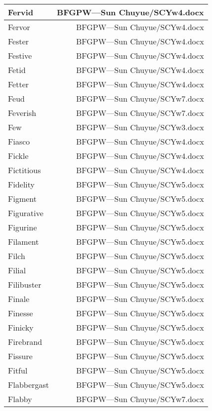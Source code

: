 \documentclass{article}
\begin{document}
\begin{center}
\begin{longtable}{|l|r|}
\hline
Fervid  &  BFGPW---Sun Chuyue/SCYw4.docx\\  
\hline
Fervor  &  BFGPW---Sun Chuyue/SCYw4.docx\\  
\hline
Fester  &  BFGPW---Sun Chuyue/SCYw4.docx\\  
\hline
Festive  &  BFGPW---Sun Chuyue/SCYw4.docx\\  
\hline
Fetid  &  BFGPW---Sun Chuyue/SCYw4.docx\\  
\hline
Fetter  &  BFGPW---Sun Chuyue/SCYw4.docx\\  
\hline
Feud  &  BFGPW---Sun Chuyue/SCYw7.docx\\  
\hline
Feverish  &  BFGPW---Sun Chuyue/SCYw7.docx\\  
\hline
Few  &  BFGPW---Sun Chuyue/SCYw3.docx\\  
\hline
Fiasco  &  BFGPW---Sun Chuyue/SCYw4.docx\\  
\hline
Fickle  &  BFGPW---Sun Chuyue/SCYw4.docx\\  
\hline
Fictitious  &  BFGPW---Sun Chuyue/SCYw4.docx\\  
\hline
Fidelity  &  BFGPW---Sun Chuyue/SCYw5.docx\\  
\hline
Figment  &  BFGPW---Sun Chuyue/SCYw5.docx\\  
\hline
Figurative  &  BFGPW---Sun Chuyue/SCYw5.docx\\  
\hline
Figurine  &  BFGPW---Sun Chuyue/SCYw5.docx\\  
\hline
Filament  &  BFGPW---Sun Chuyue/SCYw5.docx\\  
\hline
Filch  &  BFGPW---Sun Chuyue/SCYw5.docx\\  
\hline
Filial  &  BFGPW---Sun Chuyue/SCYw5.docx\\  
\hline
Filibuster  &  BFGPW---Sun Chuyue/SCYw5.docx\\  
\hline
Finale  &  BFGPW---Sun Chuyue/SCYw5.docx\\  
\hline
Finesse  &  BFGPW---Sun Chuyue/SCYw5.docx\\  
\hline
Finicky  &  BFGPW---Sun Chuyue/SCYw5.docx\\  
\hline
Firebrand  &  BFGPW---Sun Chuyue/SCYw5.docx\\  
\hline
Fissure  &  BFGPW---Sun Chuyue/SCYw5.docx\\  
\hline
Fitful  &  BFGPW---Sun Chuyue/SCYw5.docx\\  
\hline
Flabbergast  &  BFGPW---Sun Chuyue/SCYw5.docx\\  
\hline
Flabby  &  BFGPW---Sun Chuyue/SCYw7.docx\\  

\end{longtable}
\end{center}
\end{document}

